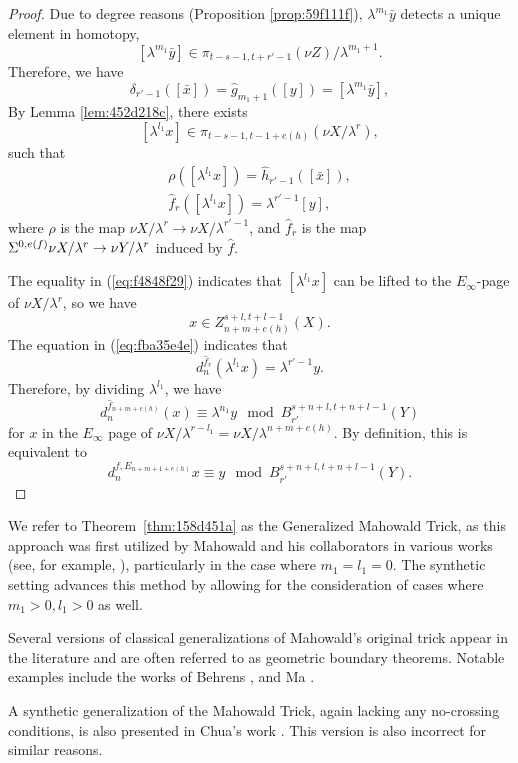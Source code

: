 \documentclass{amsart}
\numberwithin{equation}{section}
\begin{document}
\begin{proof}
    Due to degree reasons (Proposition \ref{prop:59f111f}), $\lambda^{m_1}\bar y$ detects a unique element in homotopy,
    $$[\lambda^{m_1}\bar y]\in \pi_{t-s-1, t+r'-1}(\nu Z)/\lambda^{m_1+1}.$$
    Therefore, we have
    $$\delta_{r'-1}([\bar x])=\hat g_{m_1+1}([y])=[\lambda^{m_1}\bar y],$$
    By Lemma \ref{lem:452d218c}, there exists
    $$[\lambda^{l_1}x]\in \pi_{t-s-1,t-1+e(h)}(\nu X/\lambda^r),$$
    such that
    \begin{gather}
        \rho ([\lambda^{l_1}x])=\hat h_{r'-1}([\bar x]),\label{eq:f4848f29}\\
        \hat f_r([\lambda^{l_1}x])=\lambda^{r'-1}[y],\label{eq:fba35e4e}
    \end{gather}
    where $\rho$ is the map $\nu X/\lambda^r\to \nu X/\lambda^{r'-1}$, and $\hat f_r$ is the map $\Sigma^{0,e(f)}\nu X/\lambda^r\to \nu Y/\lambda^r$ induced by $\hat f$.
    
    The equality in (\ref{eq:f4848f29}) indicates that $[\lambda^{l_1}x]$ can be lifted to the $E_\infty$-page of $\nu X/\lambda^r$, so we have
    $$x\in Z_{n+m+e(h)}^{s+l,t+l-1}(X).$$
    The equation in (\ref{eq:fba35e4e}) indicates that
    $$d^{\hat f_r}_n(\lambda^{l_1}x)=\lambda^{r'-1}y.$$
    Therefore, by dividing $\lambda^{l_1}$, we have
    $$d^{\hat f_{n+m+e(h)}}_n(x)\equiv \lambda^{n_1}y \mod B_{r'}^{s+n+l,t+n+l-1}(Y)$$
    for $x$ in the $E_\infty$ page of $\nu X/\lambda^{r-l_1}=\nu X/\lambda^{n+m+e(h)}$. By definition, this is equivalent to
    $$d^{f, E_{n+m+1+e(h)}}_nx\equiv y \mod B_{r'}^{s+n+l,t+n+l-1}(Y).$$
\end{proof}


    We refer to Theorem~\ref{thm:158d451a} as the Generalized Mahowald Trick, as this approach was first utilized by Mahowald and his collaborators in various works (see, for example, \cite{MahowaldTangora}), particularly in the case where $m_1 = l_1 = 0$. The synthetic setting advances this method by allowing for the consideration of cases where $m_1>0, l_1>0$ as well. 
    
\begin{remark}
    Several versions of classical generalizations of Mahowald's original trick appear in the literature and are often referred to as geometric boundary theorems. Notable examples include the works of Behrens \cite{Behrens}, and Ma \cite{Ma}.
\end{remark}

\begin{remark}
  A synthetic generalization of the Mahowald Trick, again lacking any no-crossing conditions, is also presented in Chua's work \cite[Theorem~12.11]{Chua}. This version is also incorrect for similar reasons.
\end{remark}
\end{document}
